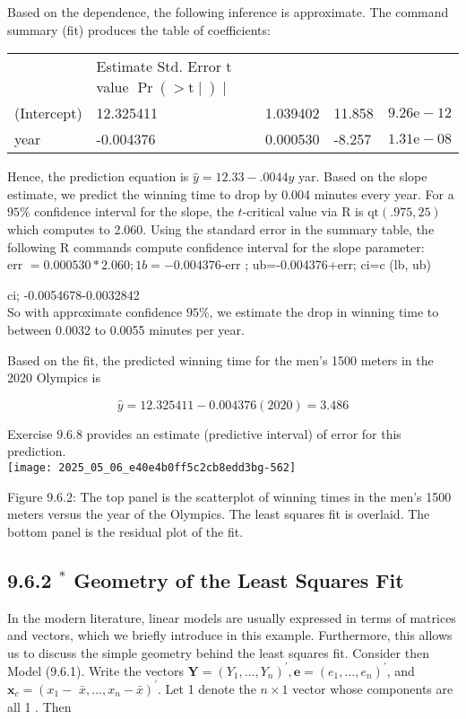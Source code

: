 Based on the dependence, the following inference is approximate. The command summary (fit) produces the table of coefficients:

\begin{center}
\begin{tabular}{lllll}
 & Estimate Std. Error t value $\operatorname{Pr}(>\mathrm{t} \mid) \mid$ &  &  &  \\
(Intercept) & 12.325411 & 1.039402 & 11.858 & $9.26 \mathrm{e}-12$ \\
year & -0.004376 & 0.000530 & -8.257 & $1.31 \mathrm{e}-08$ \\
\end{tabular}
\end{center}

Hence, the prediction equation is $\hat{y}=12.33-.0044 y$ yar. Based on the slope estimate, we predict the winning time to drop by 0.004 minutes every year. For a $95 \%$ confidence interval for the slope, the $t$-critical value via R is $\mathrm{qt}(.975,25)$ which computes to 2.060. Using the standard error in the summary table, the following R commands compute confidence interval for the slope parameter:\\
err $=0.000530 * 2.060 ; 1 b=-0.004376$-err ; ub=-0.004376+err; ci=c (lb, ub)

ci; -0.0054678-0.0032842\\
So with approximate confidence $95 \%$, we estimate the drop in winning time to between 0.0032 to 0.0055 minutes per year.

Based on the fit, the predicted winning time for the men's 1500 meters in the 2020 Olympics is


\begin{equation*}
\hat{y}=12.325411-0.004376(2020)=3.486 \tag{9.6.12}
\end{equation*}


Exercise 9.6.8 provides an estimate (predictive interval) of error for this prediction.\\
\texttt{[image: 2025\_05\_06\_e40e4b0ff5c2cb8edd3bg-562]}

Figure 9.6.2: The top panel is the scatterplot of winning times in the men's 1500 meters versus the year of the Olympics. The least squares fit is overlaid. The bottom panel is the residual plot of the fit.

\subsection*{9.6.2 ${ }^{*}$ Geometry of the Least Squares Fit}
In the modern literature, linear models are usually expressed in terms of matrices and vectors, which we briefly introduce in this example. Furthermore, this allows us to discuss the simple geometry behind the least squares fit. Consider then Model (9.6.1). Write the vectors $\mathbf{Y}=\left(Y_{1}, \ldots, Y_{n}\right)^{\prime}, \mathbf{e}=\left(e_{1}, \ldots, e_{n}\right)^{\prime}$, and $\mathbf{x}_{c}=\left(x_{1}-\right.$ $\left.\bar{x}, \ldots, x_{n}-\bar{x}\right)^{\prime}$. Let 1 denote the $n \times 1$ vector whose components are all 1 . Then

